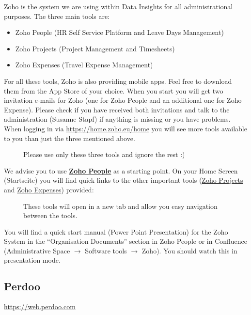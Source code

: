 \documentclass[11pt]{report}
\begin{document}
Zoho is the system we are using within Data Insights for all administrational purposes. The three main tools are:
\begin{itemize}
\item Zoho People (HR Self Service Platform and Leave Days Management)
\item Zoho Projects (Project Management and Timesheets)
\item Zoho Expenses (Travel Expense Management)
\end{itemize}
For all these tools, Zoho is also providing mobile apps. Feel free to download them from the App Store of your choice.
When you start you will get two invitation e-mails for Zoho (one for Zoho People and an additional one for Zoho Expense). Please check if you have received both invitations and talk to the administration (Susanne Stapf) if anything is missing or you have problems. When logging in via \href{https://home.zoho.eu/home}{https://home.zoho.eu/home} you will see more tools available to you than just the three mentioned above.

\begin{figure}[!htb]
       \caption{\label{fig:Zoho} Please use only these three tools and ignore the rest :)}
\end{figure}

We advise you to use \href{https://people.zoho.eu/datainsightspeople/zp#home/dashboard}{\bf Zoho People} as a starting point. On your Home Screen (Startseite) you will find quick links to the other important tools (\href{https://projects.zoho.eu/portal/datainsightsgmbh#mywork}{Zoho Projects} and \href{https://expense.zoho.eu/app#/home/dashboard}{Zoho Expenses}) provided:

\begin{figure}[!htb]
       \caption {\label{fig:Zoho2} These tools will open in a new tab and allow you easy navigation between the tools.}
\end{figure}

You will find a quick start manual (Power Point Presentation) for the Zoho System in the “Organisation Documents” section in Zoho People or in Confluence (Administrative Space $\rightarrow$ Software tools $\rightarrow$ Zoho). You should watch this in presentation mode.

\subsection{Perdoo}
\label{Perdoo}
\href{https://web.perdoo.com}{https://web.perdoo.com}\\
\end{document}
